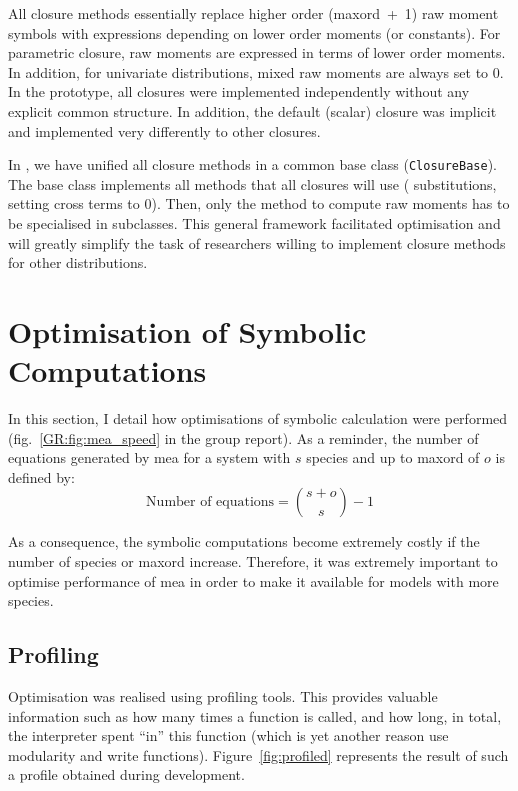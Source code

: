 All closure methods essentially replace higher order (\gls{maxord}~+~1) raw moment symbols with expressions depending on lower order moments (or constants).
For parametric closure, raw moments are expressed in terms of lower order moments.
In addition, for univariate distributions, mixed raw moments are always set to $0$.
In the \mat{} prototype, all closures were implemented independently without any explicit common structure.
In addition, the default (scalar) closure was implicit and implemented very differently to other closures.

In \means, we have unified all closure methods in a common base class (\texttt{ClosureBase}).
The base class implements all methods that all closures will use (\eg{} substitutions, setting cross terms to $0$).
Then, only the method to compute raw moments has to be specialised in subclasses.
This general framework facilitated optimisation and will greatly simplify the task of researchers willing
to implement closure methods for other distributions.

\section{Optimisation of Symbolic Computations}

\label{sec:optimisation}

In this section, I detail how optimisations of symbolic calculation were performed (fig.~\ref*{GR:fig:mea_speed} in the group report).
As a reminder, the number of equations generated by \gls{mea} for a system with $s$ species and up to \gls{maxord} of $o$
is defined by:
\begin{equation}
    \text{Number of equations} = {{s + o} \choose {s}} - 1
    \label{eq:number_of_equations}
\end{equation}

As a consequence, the symbolic computations become extremely costly if the number of species or \gls{maxord} increase.
Therefore, it was extremely important to optimise performance of \gls{mea} in order to make it available for models with more species.

\subsection{Profiling}

Optimisation was realised using \py{} profiling tools.
This provides valuable information such as how many times a function is called, and how long, in total,
the interpreter spent ``in'' this function (which is yet another reason use modularity and write functions).
Figure~\ref{fig:profiled} represents the result of such a profile obtained during development.

